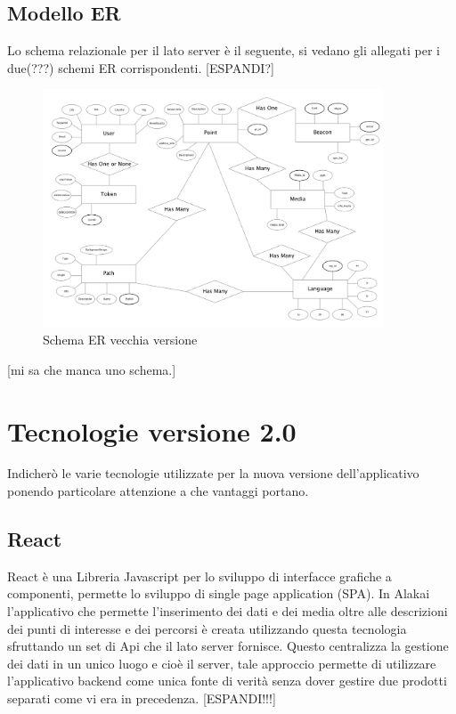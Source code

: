 		\subsection{Modello ER}\vspace{5mm}
		
	Lo schema relazionale per il lato server è il seguente, si vedano gli allegati per i due(???) schemi ER corrispondenti. [ESPANDI?]  \vspace{5mm}
	
\begin{figure}[h]
\centering
\includegraphics[width=0.9\textwidth]{images/erOld.png}
\caption{Schema ER vecchia versione}
\end{figure}
\vspace{5mm}

[mi sa che manca uno schema.]
	
\section{Tecnologie versione 2.0}\vspace{5mm}
Indicherò le varie tecnologie utilizzate per la nuova versione dell'applicativo ponendo particolare attenzione a che vantaggi portano.\vspace{5mm}

	\subsection{React}\vspace{5mm}

React è una Libreria Javascript per lo sviluppo di interfacce grafiche a componenti, permette lo sviluppo di single page application (SPA). In Alakai l’applicativo che permette l’inserimento dei dati e dei media oltre alle descrizioni dei punti di interesse e dei percorsi è creata utilizzando questa tecnologia sfruttando un set di Api che il lato server fornisce. Questo centralizza la gestione dei dati in un unico luogo e cioè il server, tale approccio permette di utilizzare l'applicativo backend come unica fonte di verità senza dover gestire due prodotti separati come vi era in precedenza. [ESPANDI!!!]\vspace{5mm}

